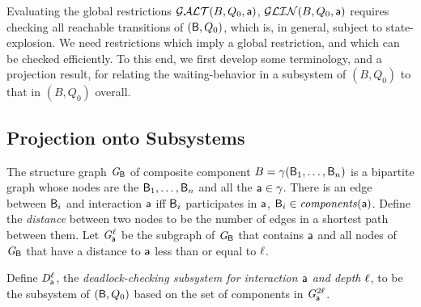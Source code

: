 
   \label{s:local.preamble}
%   

Evaluating the global restrictions $\mathcal{GALT}(B,Q_0,\mathsf{a})$, $\mathcal{GLIN}(B,Q_0,\mathsf{a})$ requires checking all reachable transitions of
$(\mathsf{B}, Q_0)$, which is, in general, subject to state-explosion.
We need restrictions which imply a global restriction, 
and which can be checked efficiently.
%
To this end, we first develop some terminology, and a projection result, for relating the waiting-behavior in a
subsystem of $(B,Q_0)$ to that in $(B,Q_0)$ overall.



\subsection{Projection onto Subsystems}
\label{s:projection}

%




 \label{def:structure-graph} The structure
graph $\mathit{G}_{\mathsf{B}}$ of composite component $B = \gamma(\mathsf{B}_1,\dots,\mathsf{B}_n)$ is a
bipartite graph whose nodes are the $\mathsf{B}_1, \ldots, \mathsf{B}_n$ and all the
$\mathsf{a} \in \gamma$.  There is an edge between $\mathsf{B}_i$ and
interaction $\mathsf{a}$ iff $\mathsf{B}_i$ participates in $\mathsf{a}$, \ie $\mathsf{B}_i \in \mathit{components}(\mathsf{a})$.  Define the
\emph{distance} between two nodes to be the number of edges in a shortest path
between them.  Let $\mathit{G}_{\mathsf{a}}^{\ell}$ be the subgraph
of $\mathit{G}_{\mathsf{B}}$ that contains $\mathsf{a}$ and all nodes of $\mathit{G}_{\mathsf{B}}$
that have a distance to $\mathsf{a}$ less than or equal to $\ell$.
\ed



 \label{def:dsk}
Define $\mathit{D}_{\mathsf{a}}^{\ell}$, the \emph{deadlock-checking subsystem for interaction $\mathsf{a}$ and
depth $\ell$}, to be the subsystem of $(\mathsf{B}, Q_0)$ based on the set of
components in $\mathit{G}_{\mathsf{a}}^{2\ell}$.  %
\ed

